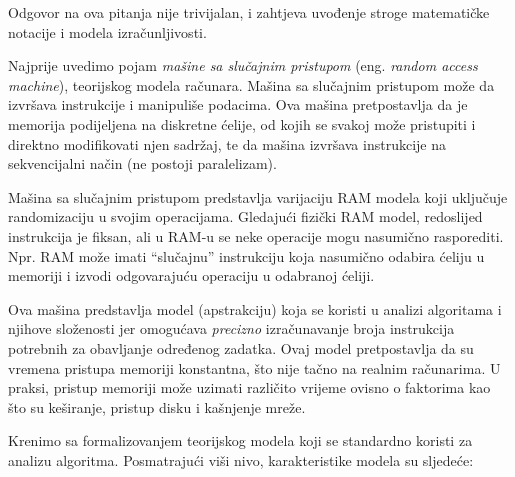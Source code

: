Odgovor na ova pitanja nije trivijalan, i zahtjeva uvođenje stroge matematičke notacije i modela izračunljivosti. 

Najprije uvedimo pojam \textit{mašine sa slučajnim pristupom} (eng. \textit{random access machine}), teorijskog modela računara.  Mašina sa slučajnim pristupom može da izvršava instrukcije i manipuliše podacima. Ova mašina pretpostavlja da je memorija  %
podijeljena na diskretne ćelije, od kojih se svakoj može pristupiti i direktno modifikovati njen sadržaj, te da mašina izvršava instrukcije na sekvencijalni način (ne postoji paralelizam).

Mašina sa slučajnim pristupom predstavlja varijaciju RAM modela koji uključuje randomizaciju u svojim operacijama. Gledajući fizički RAM model, redoslijed instrukcija je fiksan, ali u RAM-u se neke operacije mogu nasumično rasporediti. Npr. RAM može imati ``slučajnu''  instrukciju koja nasumično odabira ćeliju u memoriji i izvodi odgovarajuću operaciju u odabranoj ćeliji.

Ova mašina predstavlja model (apstrakciju) koja se koristi u analizi algoritama i njihove složenosti jer omogućava \textit{precizno} izračunavanje broja instrukcija potrebnih za obavljanje određenog zadatka. Ovaj model pretpostavlja da su vremena pristupa memoriji konstantna, što nije tačno na realnim računarima. U praksi, pristup memoriji može uzimati različito vrijeme ovisno o faktorima kao što su keširanje, pristup disku i kašnjenje mreže.

Krenimo sa formalizovanjem teorijskog modela koji 
se standardno koristi za analizu algoritma.  Posmatrajući viši nivo,   karakteristike modela su sljedeće:

